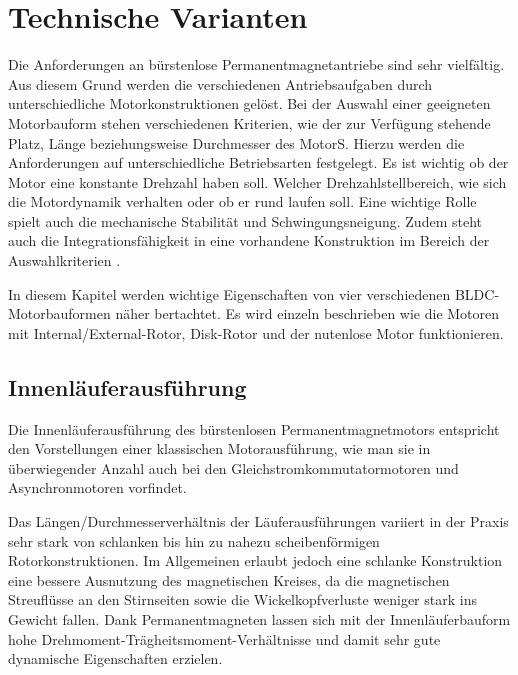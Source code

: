 \section{Technische Varianten}

Die Anforderungen an bürstenlose Permanentmagnetantriebe sind sehr vielfältig. Aus diesem Grund werden die verschiedenen Antriebsaufgaben durch unterschiedliche Motorkonstruktionen gelöst. Bei der Auswahl einer geeigneten Motorbauform stehen verschiedenen Kriterien, wie der zur Verfügung stehende Platz, Länge beziehungsweise Durchmesser des MotorS.  Hierzu werden die Anforderungen auf unterschiedliche Betriebsarten festgelegt. Es ist wichtig ob der Motor eine konstante Drehzahl haben soll. Welcher Drehzahlstellbereich, wie sich die Motordynamik verhalten oder ob er rund laufen soll. Eine wichtige Rolle spielt auch die mechanische Stabilität und Schwingungsneigung. Zudem steht auch die Integrationsfähigkeit in eine vorhandene Konstruktion im Bereich der Auswahlkriterien \parencite[S. 74]{Stölting2011}.

In diesem Kapitel werden wichtige Eigenschaften von vier verschiedenen BLDC-Motorbauformen näher bertachtet. Es wird einzeln beschrieben wie die Motoren mit Internal/External-Rotor, Disk-Rotor und der nutenlose Motor funktionieren.

\subsection{Innenläuferausführung}
Die Innenläuferausführung des bürstenlosen Permanentmagnetmotors entspricht den Vorstellungen einer klassischen Motorausführung, wie man sie in überwiegender Anzahl auch bei den Gleichstromkommutatormotoren und Asynchronmotoren vorfindet.

Das Längen/Durchmesserverhältnis der Läuferausführungen variiert in der Praxis sehr stark von schlanken bis hin zu nahezu scheibenförmigen Rotorkonstruktionen. Im Allgemeinen erlaubt jedoch eine schlanke Konstruktion eine bessere Ausnutzung des magnetischen Kreises, da die magnetischen Streuflüsse an den Stirnseiten sowie die Wickelkopfverluste weniger stark ins Gewicht fallen. Dank Permanentmagneten lassen sich mit der Innenläuferbauform hohe Drehmoment-Trägheitsmoment-Verhältnisse und damit sehr gute dynamische Eigenschaften erzielen.

